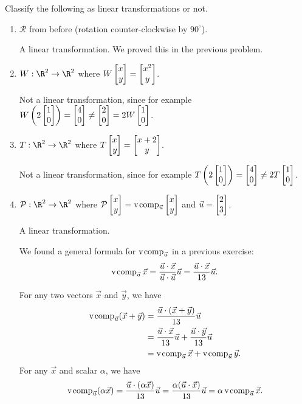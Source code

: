 	\begin{parts}
		\item Classify the following as linear transformations or not.
			\begin{enumerate}
				\item $\mathcal R$ from before (rotation counter-clockwise by $90^\circ$).
					\begin{solution}
						A linear transformation. We proved this in the previous problem.
					\end{solution}
				\item $W:\R^2\to\R^2$ where $W\mat{x\\y}=\matc{x^2\\y}$.
					\begin{solution}
						Not a linear transformation, since for example
						$W\left(2\mat{1\\0}\right)=\mat{4\\0}\neq\mat{2\\0}=2W\mat{1\\0}$.
					\end{solution}
				\item $T:\R^2\to\R^2$ where $T\mat{x\\y}=\matc{x+2\\y}$.
					\begin{solution}
						Not a linear transformation, since for example
						$T\left(2\mat{1\\0}\right) = \mat{4\\0} \neq 2T\mat{1\\0}$.
					\end{solution}
				\item $\mathcal P:\R^2\to\R^2$ where
					$\mathcal P\mat{x\\y}=\Comp_{\vec u}\mat{x\\y}$ and
					$\vec u=\mat{2\\3}$.
					\begin{solution}
						A linear transformation.

						We found a general formula for $\operatorname{\operatorname{v\hspace{1pt}comp}}_{\vec u}$ in a previous
						exercise:
						\[
							\operatorname{\operatorname{v\hspace{1pt}comp}}_{\vec u}\vec x
							=\frac{\vec u\cdot\vec x}{\vec u\cdot\vec u}\vec u
							=\frac{\vec u\cdot\vec x}{13}\vec u.
						\]

						For any two vectors $\vec x$ and $\vec y$, we have
						\begin{align*}
							\operatorname{\operatorname{v\hspace{1pt}comp}}_{\vec u}(\vec x + \vec y)&=\frac{\vec u\cdot(\vec x + \vec y)}{13}\vec u\\
							&=\frac{\vec u\cdot\vec x}{13}\vec u + \frac{\vec u\cdot\vec y}{13}\vec u\\
							&=\operatorname{\operatorname{v\hspace{1pt}comp}}_{\vec u}\vec x + \operatorname{\operatorname{v\hspace{1pt}comp}}_{\vec u}\vec y.
						\end{align*}
						For any $\vec x$ and scalar $\alpha$, we have
						\[
							\operatorname{\operatorname{v\hspace{1pt}comp}}_{\vec u}(\alpha\vec x)
							=\frac{\vec u\cdot(\alpha\vec x)}{13}\vec u
							=\frac{\alpha(\vec u\cdot\vec x)}{13}\vec u
							=\alpha\operatorname{\operatorname{v\hspace{1pt}comp}}_{\vec u}\vec x.
						\]
					\end{solution}
			\end{enumerate}
	\end{parts}

